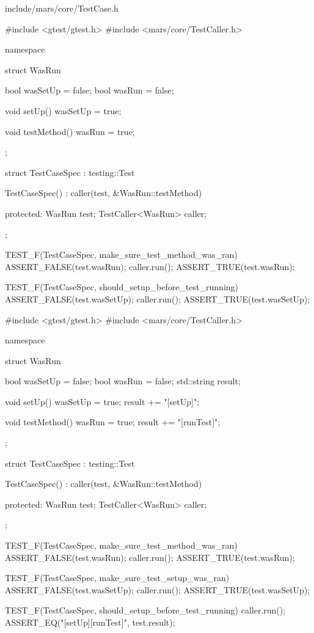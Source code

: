 \begin{diff}{include/mars/core/TestCase.h}
\begin{minicpp}

#include <gtest/gtest.h>
#include <mars/core/TestCaller.h>

namespace {
  struct WasRun {
    bool wasSetUp = false;
    bool wasRun = false;

    void setUp() {
      wasSetUp = true;
    }

    void testMethod() {
      wasRun = true;
    }
  };

  struct TestCaseSpec : testing::Test {
    TestCaseSpec()
      : caller(test, &WasRun::testMethod) {
    }

  protected:
    WasRun test;
    TestCaller<WasRun> caller;
  };
}

TEST_F(TestCaseSpec, make_sure_test_method_was_ran) {
  ASSERT_FALSE(test.wasRun);
  caller.run();
  ASSERT_TRUE(test.wasRun);
}

TEST_F(TestCaseSpec, should_setup_before_test_running) {
  ASSERT_FALSE(test.wasSetUp);
  caller.run();
  ASSERT_TRUE(test.wasSetUp);
}
\end{minicpp}
\tcblower
\begin{minicpp}
#include <gtest/gtest.h>
#include <mars/core/TestCaller.h>

namespace {
  struct WasRun {
    bool wasSetUp = false;
    bool wasRun = false;
    std::string result;

    void setUp() {
      wasSetUp = true;
      result += "[setUp]";
    }

    void testMethod() {
      wasRun = true;
      result += "[runTest]";
    }
  };

  struct TestCaseSpec : testing::Test {
    TestCaseSpec()
      : caller(test, &WasRun::testMethod) {
    }

  protected:
    WasRun test;
    TestCaller<WasRun> caller;
  };
}

TEST_F(TestCaseSpec, make_sure_test_method_was_ran) {
  ASSERT_FALSE(test.wasRun);
  caller.run();
  ASSERT_TRUE(test.wasRun);
}

TEST_F(TestCaseSpec, make_sure_test_setup_was_ran) {
  ASSERT_FALSE(test.wasSetUp);
  caller.run();
  ASSERT_TRUE(test.wasSetUp);
}

TEST_F(TestCaseSpec, should_setup_before_test_running) {
  caller.run();
  ASSERT_EQ("[setUp][runTest]", test.result);
}
\end{minicpp}
\end{diff}

